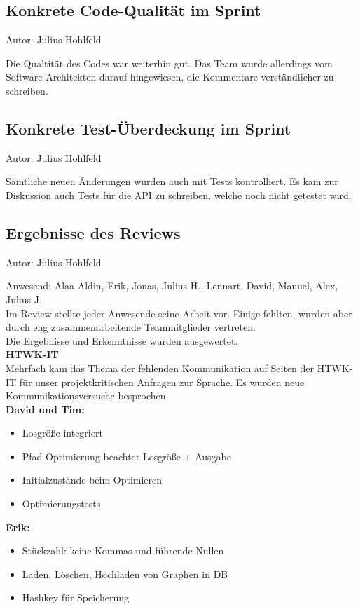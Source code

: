 \subsection{Konkrete Code-Qualität im Sprint}
{\small Autor: Julius Hohlfeld}

Die Qualtität des Codes war weiterhin gut. Das Team wurde allerdings vom Software-Architekten darauf hingewiesen, die Kommentare verständlicher zu schreiben.\\

\subsection{Konkrete Test-Überdeckung im Sprint}
{\small Autor: Julius Hohlfeld}

Sämtliche neuen Änderungen wurden auch mit Tests kontrolliert. Es kam zur Diskussion auch Tests für die API zu schreiben, welche noch nicht getestet wird.\\

\subsection{Ergebnisse des Reviews}
{\small Autor: Julius Hohlfeld}

Anwesend: Alaa Aldin, Erik, Jonas, Julius H., Lennart, David, Manuel, Alex, Julius J. \\

Im Review stellte jeder Anwesende seine Arbeit vor. Einige fehlten, wurden aber durch eng zusammenarbeitende Teammitglieder vertreten. \\
Die Ergebnisse und Erkenntnisse wurden ausgewertet.\\

\textbf{HTWK-IT}\\
Mehrfach kam das Thema der fehlenden Kommunikation auf Seiten der HTWK-IT für unser projektkritischen Anfragen zur Sprache. Es wurden neue Kommunikationsversuche besprochen.
\\

\textbf{David und Tim:}
\begin{itemize}
\item Losgröße integriert
\item Pfad-Optimierung beachtet Losgröße + Ausgabe
\item Initialzustände beim Optimieren
\item Optimierungstests
\end{itemize}

\textbf{Erik:}
\begin{itemize}
\item Stückzahl: keine Kommas und führende Nullen
\item Laden, Löschen, Hochladen von Graphen in DB
\item Hashkey für Speicherung
\end{itemize}

